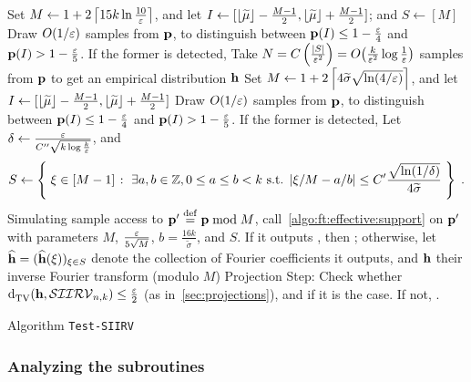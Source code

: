 \begin{algorithm}[ht]
\begin{algorithmic}[1]
    \label{algo:step:small:variance}
        \State\label{algo:step:def:interval:smallvariance} Set $M \gets 1+2\clg{15k \ln\frac{10}{\eps}}$, and let $I \gets [\flr{ \widetilde{\mu} }-\frac{M-1}{2},\flr{ \widetilde{\mu} }+\frac{M-1}{2}]$; and $S\gets [M]$
        \State\label{algo:step:effectivesupport:smallvariance} Draw $O(1/\eps)$ samples from $\p$, to distinguish between $\p(I) \leq 1-\frac{\eps}{4}$ and $\p(I) > 1-\frac{\eps}{5}$.
        If the former is detected, \Return \reject
        \State\label{algo:step:empirical:smallvariance} Take $N=C\left( \frac{\abs{S}}{\eps^2} \right) = \bigO{ \frac{k}{\eps^2} \log\frac{1}{\eps} }$ samples from $\p$ to get an empirical distribution $\h$
    \Else\label{algo:step:big:variance}
        \State\label{algo:step:def:interval} Set $M \gets 1+2\clg{ 4\widetilde{\sigma}\sqrt{\ln(4/\eps)} }$, and let $I \gets [\flr{ \widetilde{\mu} }-\frac{M-1}{2},\flr{ \widetilde{\mu} }+\frac{M-1}{2}]$
        \State\label{algo:step:effectivesupport} Draw $O(1/\eps)$ samples from $\p$, to distinguish between $\p(I) \leq 1-\frac{\eps}{4}$ and $\p(I) > 1-\frac{\eps}{5}$.
        If the former is detected, \Return \reject
        \State\label{algo:step:dft:computation} Let $\delta\gets \frac{\eps}{C''\sqrt{k\log\frac{k}{\eps}}}$, and 
            \[
              S \gets \setOfSuchThat{ \xi \in [M-1] }{ \exists a, b \in \Z, 0 \leq a \leq b < k \textrm{ s.t. } |\xi/M - a/b| \leq  C'\frac{\sqrt{\ln(1/\delta)}}{4\widetilde{\sigma}} } \;.
            \]
        \State\label{algo:step:fourier:support} Simulating sample access to $\p'\eqdef \p\bmod M$, call~\cref{algo:ft:effective:support} on $\p'$ with parameters $M$, $\frac{\eps}{5\sqrt{M}}$, $b=\frac{16k}{\widetilde{\sigma}}$, and $S$. If it outputs \reject, then \Return \reject; otherwise, let $\fourier{\h}=(\fourier{\h}(\xi))_{\xi\in S}$ denote the collection of Fourier coefficients it outputs, and $\h$ their inverse Fourier transform (modulo $M$) 
    \EndIf
    \State \label{algo:step:cover}\textsf{Projection Step:} Check whether $\totalvardist{\h}{\classksiirv[n]{k}} \leq \frac{\eps}{2}$ (as in~\cref{sec:projections}), and \Return \accept if it is the case. If not, \Return \reject.  
  \end{algorithmic}
  \caption{Algorithm \texttt{Test-SIIRV}}\label{algo:ksiirv:tester}
\end{algorithm}


\subsubsection{Analyzing the subroutines}

